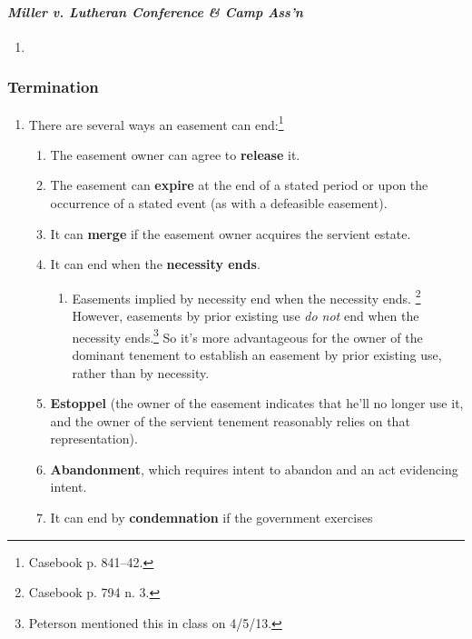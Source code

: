 \paragraph{\emph{Miller v. Lutheran Conference \& Camp Ass'n}}

\begin{enumerate}
    \item %
\end{enumerate}

\subsubsection{Termination}

\begin{enumerate}
    \item There are several ways an easement can end:\footnote{Casebook p. 
    841--42.}
    \begin{enumerate}
        \item The easement owner can agree to \textbf{release} it.
        \item The easement can \textbf{expire} at the end of a stated period 
        or upon the occurrence of a stated event (as with a defeasible 
        easement).
        \item It can \textbf{merge} if the easement owner acquires the 
        servient estate.
        \item It can end when the \textbf{necessity ends}.
        \begin{enumerate}
            \item Easements implied by necessity end when the necessity 
            ends. \footnote{Casebook p. 794 n. 3.} However, easements by prior 
            existing use \emph{do not} end when the necessity 
            ends.\footnote{Peterson mentioned this in class on 4/5/13.} So 
            it's more advantageous for the owner of the dominant tenement to 
            establish an easement by prior existing use, rather than by 
            necessity.
        \end{enumerate}
        \item \textbf{Estoppel} (the owner of the easement indicates that 
        he'll no longer use it, and the owner of the servient tenement 
        reasonably relies on that representation).
        \item \textbf{Abandonment}, which requires intent to abandon and an 
        act evidencing intent.
        \item It can end by \textbf{condemnation} if the government exercises 

\end{enumerate}
\end{enumerate}
